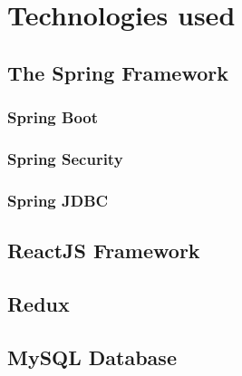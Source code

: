 \chapter{Technologies used}
\label{chapter:technologiesUsed}


\section{The Spring Framework}
\label{section:springBootFramework}

\subsection{Spring Boot}
\label{subsection:springBoot}

\subsection{Spring Security}
\label{subsection:proposedSolution}

\subsection{Spring JDBC}
\label{subsection:springJDBC}


\section{ReactJS Framework}
\label{section:reactJSFramework}

\section{Redux}
\label{section:redux}


\section{MySQL Database}
\label{section:mysqlDatabase}





